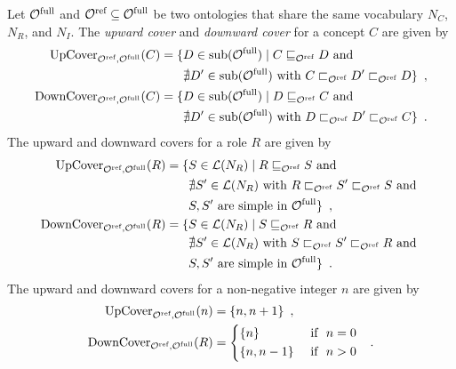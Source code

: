 \begin{definition} \label{def:covers}
  Let $\Omcfull$ and $\Omcref \subseteq \Omcfull$ be two \SROIQ ontologies that share the same vocabulary $N_C$, $N_R$, and $N_I$. The \emph{upward cover} and \emph{downward cover} for a concept $C$ are given by
  \begin{align*}
    \UpC_{\Omcref,\Omcfull}(C) = \{ & D \in \sub(\Omcfull) \mid C \sqsubseteq_\Omcref D \text{ and } \\
    & \nexists D' \in \sub(\Omcfull) \text{ with } C \sqsubset_\Omcref D' \sqsubset_\Omcref D \} \enspace, \\
    \DownC_{\Omcref,\Omcfull}(C) = \{ & D \in \sub(\Omcfull) \mid D \sqsubseteq_\Omcref C \text{ and } \\
    & \nexists D' \in \sub(\Omcfull) \text{ with } D \sqsubset_\Omcref D' \sqsubset_\Omcref C \} \enspace.
  \end{align*}
  The upward and downward covers for a role $R$ are given by
  \begin{align*}
    \UpC_{\Omcref,\Omcfull}(R) = \{ & S \in \Lmc(N_R) \mid R \sqsubseteq_\Omcref S \text{ and } \\
    & \nexists S' \in \Lmc(N_R) \text{ with } R \sqsubset_\Omcref S' \sqsubset_\Omcref S \text{ and } \\
    & S, S' \text{ are simple in } \Omcfull \} \enspace, \\
    \DownC_{\Omcref,\Omcfull}(R) = \{ & S \in \Lmc(N_R) \mid S \sqsubseteq_\Omcref R \text{ and } \\
    & \nexists S' \in \Lmc(N_R) \text{ with } S \sqsubset_\Omcref S' \sqsubset_\Omcref R \text{ and } \\
    & S, S' \text{ are simple in } \Omcfull \} \enspace.
  \end{align*}
  The upward and downward covers for a non-negative integer $n$ are given by
  \begin{align*}
    \UpC_{\Omcref,\Omcfull}(n) &= \{ n, n + 1 \} \enspace, \\
    \DownC_{\Omcref,\Omcfull}(R) &=
    \begin{cases*}
      \{ n \} & \text{ if } $n = 0$ \\
      \{ n, n - 1 \} & \text{ if } $n > 0$
    \end{cases*} \enspace.
  \end{align*}
\end{definition}

